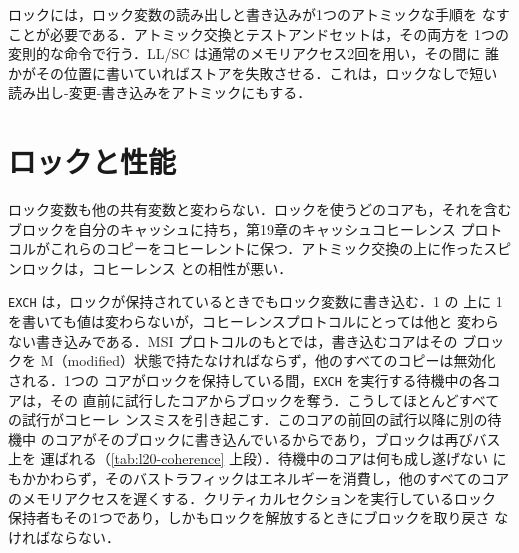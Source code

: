 \documentclass[../main.tex]{subfiles}
\begin{document}
\begin{keypoint}
  ロックには，ロック変数の読み出しと書き込みが1つのアトミックな手順を
  なすことが必要である．アトミック交換とテストアンドセットは，その両方を
  1つの変則的な命令で行う．LL/SC は通常のメモリアクセス2回を用い，その間に
  誰かがその位置に書いていればストアを失敗させる．これは，ロックなしで短い
  読み出し-変更-書き込みをアトミックにもする．
\end{keypoint}

\section{ロックと性能}
\label{sec:l20-performance}

ロック変数も他の共有変数と変わらない．ロックを使うどのコアも，それを含む
ブロックを自分のキャッシュに持ち，第19章のキャッシュコヒーレンス
プロトコルがこれらのコピーをコヒーレントに保つ．アトミック交換の上に作ったスピンロックは，コヒーレンス
との相性が悪い．

\texttt{EXCH} は，ロックが保持されているときでもロック変数に書き込む．1 の
上に 1 を書いても値は変わらないが，コヒーレンスプロトコルにとっては他と
変わらない書き込みである．MSI プロトコルのもとでは，書き込むコアはその
ブロックを M（modified）状態で持たなければならず，他のすべてのコピーは無効化
される．1つの
コアがロックを保持している間，\texttt{EXCH} を実行する待機中の各コアは，その
直前に試行したコアからブロックを奪う．こうしてほとんどすべての試行がコヒーレ
ンスミスを引き起こす．このコアの前回の試行以降に別の待機中
のコアがそのブロックに書き込んでいるからであり，ブロックは再びバス上を
運ばれる（\cref{tab:l20-coherence} 上段）．待機中のコアは何も成し遂げない
にもかかわらず，そのバストラフィックはエネルギーを消費し，他のすべてのコア
のメモリアクセスを遅くする．クリティカルセクションを実行しているロック
保持者もその1つであり，しかもロックを解放するときにブロックを取り戻さ
なければならない．
\end{document}
